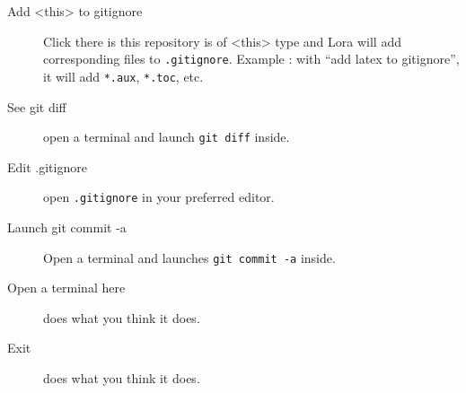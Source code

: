 \documentclass[a4paper,12pt]{article}
\newcommand{\info}[1]{\texttt{#1}}
\begin{document}
\begin{description} 
    \item[Add <this> to gitignore] Click there is this repository is of <this> type and Lora will add corresponding files to \info{.gitignore}. Example : with ``add latex to gitignore'', it will add \info{*.aux}, \info{*.toc}, etc.
    \item[See git diff] open a terminal and launch \info{git diff} inside.
    \item[Edit .gitignore] open \info{.gitignore} in your preferred editor.
    \item[Launch git commit -a] Open a terminal and launches \info{git commit -a} inside.
    \item[Open a terminal here] does what you think it does.
    \item[Exit] does what you think it does.
\end{description}
\end{document}
